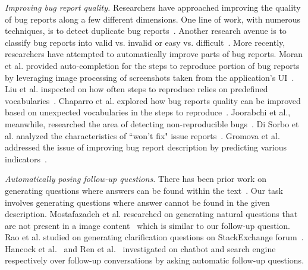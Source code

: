 \noindent
{\em Improving bug report quality.} Researchers have approached improving the quality of bug reports along a few different dimensions. One line of work, with numerous techniques, is to detect duplicate bug reports~\cite{chaparro19reformulating}. Another research avenue is to classify bug reports into valid vs. invalid or easy vs. difficult~\cite{fan20chaff,hooimeijer07modeling}. More recently, researchers have attempted to automatically improve parts of bug reports. Moran et al. provided auto-completion for the steps to reproduce portion of bug reports by leveraging image processing of screenshots taken from the application's UI~\cite{moran15autocompleting}. Liu et al. inspected on how often steps to reproduce relies on predefined vocabularies~\cite{liu2020automated}. Chaparro et al. explored how bug reports quality can be improved based on unexpected vocabularies in the steps to reproduce~\cite{Chaparro2019AssessingTQ}. Joorabchi et al., meanwhile, researched the area of detecting non-reproducible bugs~\cite{erfani2014works}. Di Sorbo et al. analyzed the characteristics of ``won't fix" issue reports~\cite{Sorbo2019WontWF}. Gromova et al. addressed the issue of improving bug report description by predicting various indicators~\cite{gromova2019raising}.

\noindent
{\em Automatically posing follow-up questions.} There has been prior work on generating questions where answers can be found within the text~\cite{vanderwende2008importance, rus2011question, sutskever2014sequence}. Our task involves generating questions where answer cannot be found in the given description. Mostafazadeh et al. researched on generating natural questions that are not present in a image content~\cite{Mostafazadeh_2016} which is similar to our follow-up question. Rao et al. studied on generating clarification questions on StackExchange forum~\cite{rao-daume-iii-2018-learning}. Hancock et al.~\cite{Hancock2019LearningFD} and Ren et al.~\cite{Ren2020ConversationsWS} investigated on chatbot and search engine respectively over follow-up conversations by asking automatic follow-up questions.


 